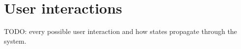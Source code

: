 \section{User interactions}
TODO: every possible user interaction and how states propagate through the
system.